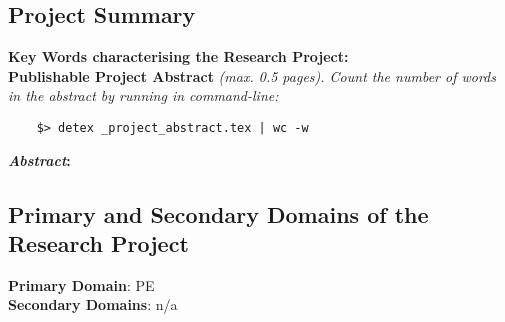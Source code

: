 \subsection{Project Summary}

\textbf{Key Words characterising the Research Project:}
\keywords
\\

\noindent
\textbf{Publishable Project Abstract}
\emph{(max. 0.5 pages).
Count the number of words in the abstract by running in command-line:
}
\begin{verbatim}
    $> detex _project_abstract.tex | wc -w
\end{verbatim}

\noindent\textbf{\emph{Abstract}:}


\subsection{Primary and Secondary Domains of the Research Project}

\textbf{Primary Domain}: PE
\\
\textbf{Secondary Domains}: n/a









% 
